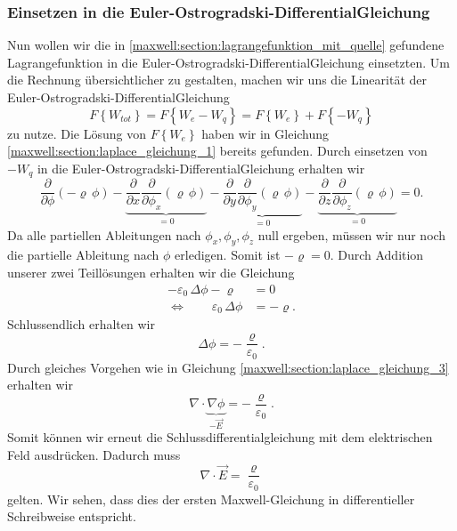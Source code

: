 \subsubsection{Einsetzen in die Euler-Ostrogradski-DifferentialGleichung}
Nun wollen wir die in \eqref{maxwell:section:lagrangefunktion_mit_quelle} gefundene Lagrangefunktion in die Euler-Ostrogradski-DifferentialGleichung einsetzten.
Um die Rechnung übersichtlicher zu gestalten, machen wir uns die Linearität der Euler-Ostrogradski-DifferentialGleichung
\begin{equation}
F\left\{W_{tot}\right\}
=
F\left\{W_e - W_q\right\}
=
F\left\{W_e\right\} + F\left\{-W_q\right\}
\label{maxwell:section:linearität_von_DGL}
\end{equation}
zu nutze.
Die Lösung von $F\left\{W_e\right\}$ haben wir in Gleichung \eqref{maxwell:section:laplace_gleichung_1} bereits gefunden.
Durch einsetzen von $-W_q$ in die Euler-Ostrogradski-DifferentialGleichung erhalten wir
\[
\frac{\partial}{\partial\phi}\left(-\varrho\,\phi\right) - \underbrace{\frac{\partial}{\partial x}\frac{\partial}{\partial\phi_x}\left(\varrho\,\phi\right)}_{=0} - \underbrace{\frac{\partial}{\partial y}\frac{\partial}{\partial\phi_y}\left(\varrho\,\phi\right)}_{=0} - \underbrace{\frac{\partial}{\partial z}\frac{\partial}{\partial\phi_z}\left(\varrho\,\phi\right)}_{=0}
=
0.
\]
Da alle partiellen Ableitungen nach $\phi_x, \phi_y, \phi_z$ null ergeben, müssen wir nur noch die partielle Ableitung nach $\phi$ erledigen.
Somit ist
\(
-\varrho
=
0.
\)
Durch Addition unserer zwei Teillösungen erhalten wir die Gleichung
\begin{align*}
-\varepsilon_0\,\Delta\phi - \varrho
&=
0
\\
\Leftrightarrow \qquad \varepsilon_0\,\Delta\phi
&=
-\varrho.
\end{align*}
Schlussendlich erhalten wir
\begin{equation}
\Delta\phi
=
-\frac{\varrho}{\varepsilon_0}.
\label{maxwell:section:erste_maxwellgleichung_1}
\end{equation}
Durch gleiches Vorgehen wie in Gleichung \eqref{maxwell:section:laplace_gleichung_3} erhalten wir
\[
\nabla\cdot\underbrace{\nabla\phi}_{\displaystyle-\vec{E}}
=
-\frac{\varrho}{\varepsilon_0}.
\]
Somit können wir erneut die Schlussdifferentialgleichung mit dem elektrischen Feld ausdrücken. Dadurch muss
\begin{equation}
\nabla\cdot\vec{E}
=
\frac{\varrho}{\varepsilon_0}
\label{maxwell:section:erste_maxwellgleichung_2}
\end{equation}
gelten.
Wir sehen, dass dies der ersten Maxwell-Gleichung in differentieller Schreibweise entspricht.

